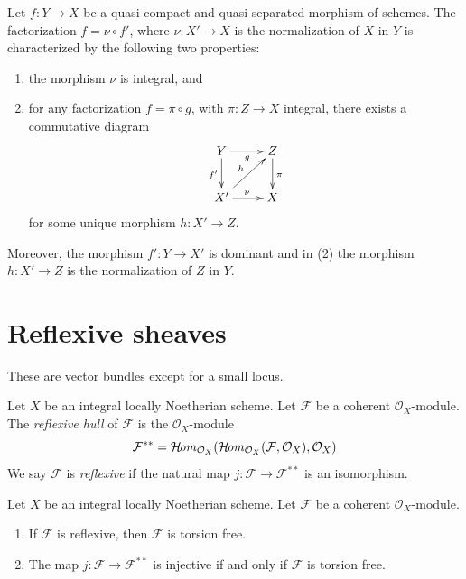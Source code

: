\begin{lemma}
\label{lemma-characterize-normalization}
Let $f : Y \to X$ be a quasi-compact and quasi-separated morphism of schemes.
The factorization $f = \nu \circ f'$, where $\nu : X' \to X$ is the
normalization of $X$ in $Y$ is characterized by the following
two properties:
\begin{enumerate}
\item the morphism $\nu$ is integral, and
\item for any factorization $f = \pi \circ g$, with $\pi : Z \to X$
integral, there exists a commutative diagram
$$
\xymatrix{
Y \ar[d]_{f'} \ar[r]_g & Z \ar[d]^\pi \\
X' \ar[ru]^h \ar[r]^\nu & X
}
$$
for some unique morphism $h : X' \to Z$.
\end{enumerate}
Moreover, the morphism $f' : Y \to X'$ is dominant and in (2) the
morphism $h : X' \to Z$ is the normalization of $Z$ in $Y$.
\end{lemma}



\section{Reflexive sheaves}
\label{section-reflexive-sheaves}

\begin{slogan}
These are vector bundles except for a small locus.
\end{slogan}

\begin{definition}
\label{definition-reflexive}
Let $X$ be an integral locally Noetherian scheme. Let $\mathcal{F}$
be a coherent $\mathcal{O}_X$-module. The {\it reflexive hull}
of $\mathcal{F}$ is the $\mathcal{O}_X$-module
$$
\mathcal{F}^{**} = \mathop{\mathcal{H}\!\mathit{om}}\nolimits_{\mathcal{O}_X}(
\mathop{\mathcal{H}\!\mathit{om}}\nolimits_{\mathcal{O}_X}(\mathcal{F}, \mathcal{O}_X), \mathcal{O}_X)
$$
We say $\mathcal{F}$ is {\it reflexive} if the natural map
$j : \mathcal{F} \longrightarrow \mathcal{F}^{**}$
is an isomorphism.
\end{definition}

\begin{lemma}
\label{lemma-reflexive-torsion-free}
Let $X$ be an integral locally Noetherian scheme. Let $\mathcal{F}$
be a coherent $\mathcal{O}_X$-module.
\begin{enumerate}
\item If $\mathcal{F}$ is reflexive, then $\mathcal{F}$ is torsion free.
\item The map $j : \mathcal{F} \longrightarrow \mathcal{F}^{**}$
is injective if and only if $\mathcal{F}$ is torsion free.
\end{enumerate}
\end{lemma}

